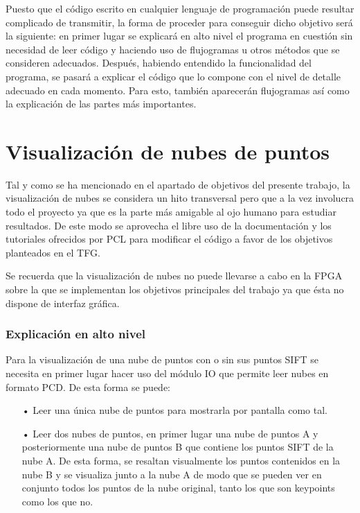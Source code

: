 Puesto que el código escrito en cualquier lenguaje de programación puede resultar complicado de transmitir, la forma de proceder para conseguir dicho objetivo será la siguiente: en primer lugar se explicará en alto nivel el programa en cuestión sin necesidad de leer código y haciendo uso de flujogramas u otros métodos que se consideren adecuados. Después, habiendo entendido la funcionalidad del programa, se pasará a explicar el código que lo compone con el nivel de detalle adecuado en cada momento. Para esto, también aparecerán flujogramas así como la explicación de las partes más importantes.

 
\section{Visualización de nubes de puntos}

Tal y como se ha mencionado en el apartado de objetivos del presente trabajo, la visualización de nubes se considera un hito transversal pero que a la vez involucra todo el proyecto ya que es la parte más amigable al ojo humano para estudiar resultados. De este modo se aprovecha el libre uso de la documentación y los tutoriales ofrecidos por PCL para modificar el código a favor de los objetivos planteados en el TFG.

Se recuerda que la visualización de nubes no puede llevarse a cabo en la FPGA sobre la que se implementan los objetivos principales del trabajo ya que ésta no dispone de interfaz gráfica.

\subsubsection{Explicación en alto nivel}
Para la visualización de una nube de puntos con o sin sus puntos SIFT se necesita en primer lugar hacer uso del módulo IO que permite leer nubes en formato PCD. De esta forma se puede:

\begin{itemize}
\item[•]Leer una única nube de puntos para mostrarla por pantalla como tal.
\item[•]Leer dos nubes de puntos, en primer lugar una nube de puntos A y posteriormente una nube de puntos B que contiene los puntos SIFT de la nube A. De esta forma, se resaltan visualmente los puntos contenidos en la nube B y se visualiza junto a la nube A de modo que se pueden ver en conjunto todos los puntos de la nube original, tanto los que son keypoints como los que no. 
\end{itemize}

